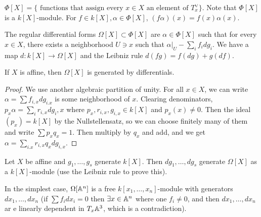 \documentclass[twoside, 10pt]{article}
\begin{document}
        \begin{defn}
            $\Phi[X] = \{ \text{ functions that assign every } x \in X \text{ an element of } T_x^{\vee} \}$. Note that $\Phi[X]$ is a $k[X]$-module. For $f \in k[X], \alpha \in \Phi[X]$, $(f \alpha)(x) = f(x) \alpha(x)$.
        \end{defn}

        \begin{defn}
            The regular differential forms $\Omega[X] \subset \Phi[X]$ are $\alpha \in \Phi[X]$ such that for every $x \in X$, there exists a neighborhood $U \ni x$ such that $\alpha|_U - \sum_i f_i dg_i$. We have a map $d: k[X] \to \Omega[X]$ and the Leibniz rule $d(fg) = f(dg) + g(df)$.
        \end{defn}

        \begin{lem}
            If $X$ is affine, then $\Omega[X]$ is generated by differentials.
            \begin{proof}
                We use another algebraic partition of unity. For all $x \in X$, we can write $\alpha = \sum f_{i,x}dg_{i.x}$ is some neighborhood of $x$. Clearing denominators, $p_x \alpha = \sum_i r_{i,x} dg_i,x$ where $p_x,r_{i,x},g_{i,x} \in k[X]$ and $p_x(x) \neq 0$. Then the ideal $(p_x) = k[X]$ by the Nullstellensatz, so we can choose finitely many of them and write $\sum p_x q_x = 1$. Then multiply by $q_x$ and add, and we get $\alpha = \sum_{i.x} r_{i,x} q_x dg_{i,x}$.
            \end{proof}
        \end{lem}

        \begin{cor}
            Let $X$ be affine and $g_1, \ldots, g_s$ generate $k[X]$. Then $dg_1, \ldots, dg_s$ generate $\Omega[X]$ as a $k[X]$-module (use the Leibniz rule to prove this).
        \end{cor}

        In the simplest case, $\Omega[\mathbb{A}^n]$ is a free $k[x_1, \ldots, x_n]$-module with generators $dx_1, \ldots, dx_n$ (if $\sum f_i dx_i = 0$ then $\exists x \in \mathbb{A}^n$ where one $f_i \neq 0$, and then $dx_1, \ldots, dx_n$ ar e linearly dependent in $T_x\mathbb{A}^3$, which is a contradiction).
\end{document}
